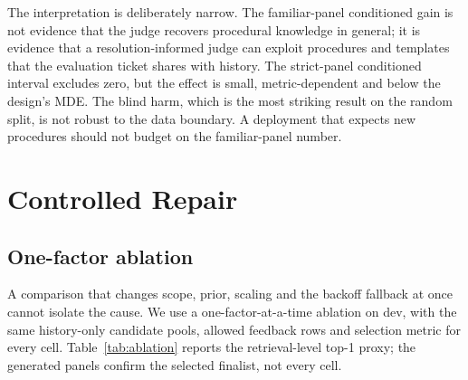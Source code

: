 \documentclass{ieeeaccess}
\begin{document}
The interpretation is deliberately narrow. The familiar-panel conditioned gain is
not evidence that the judge recovers procedural knowledge in general; it is
evidence that a resolution-informed judge can exploit procedures and templates that
the evaluation ticket shares with history. The strict-panel conditioned interval
excludes zero, but the effect is small, metric-dependent and below the design's
MDE. The blind harm, which is the most striking result on the random split, is not
robust to the data boundary. A deployment that expects new procedures should not
budget on the familiar-panel number.


\section{Controlled Repair}
\label{sec:repair}

\subsection{One-factor ablation}
A comparison that changes scope, prior, scaling and the backoff fallback at once
cannot isolate the cause. We use a one-factor-at-a-time ablation on dev, with the
same history-only candidate pools, allowed feedback rows and selection metric for
every cell. Table~\ref{tab:ablation} reports the retrieval-level top-1 proxy; the
generated panels confirm the selected finalist, not every cell.
\end{document}
